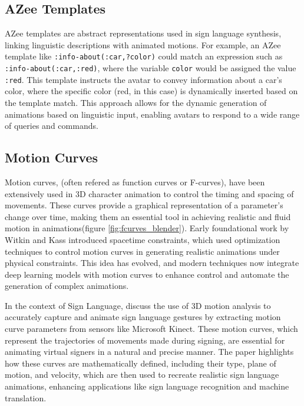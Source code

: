 \documentclass[../../main.tex]{subfiles}
\begin{document}
\subsection{AZee Templates}
\label{ch:intermediate_blocks:related_work:azee_templates}

AZee templates are abstract representations used in sign language synthesis, linking linguistic descriptions with animated motions. For example, an AZee template like \texttt{:info-about(:car,?color)} could match an expression such as \texttt{:info-about(:car,:red)}, where the variable \texttt{color} would be assigned the value \texttt{:red}. This template instructs the avatar to convey information about a car's color, where the specific color (red, in this case) is dynamically inserted based on the template match. This approach allows for the dynamic generation of animations based on linguistic input, enabling avatars to respond to a wide range of queries and commands.

\subsection{Motion Curves}
\label{ch:intermediate_blocks:related_work:motion_curves}

Motion curves, (often refered as function curves or F-curves), have been extensively used in 3D character animation to control the timing and spacing of movements. These curves provide a graphical representation of a parameter's change over time, making them an essential tool in achieving realistic and fluid motion in animations(figure \ref{fig:fcurves_blender}). Early foundational work by Witkin and Kass \cite{witkin1988spacetime} introduced spacetime constraints, which used optimization techniques to control motion curves in generating realistic animations under physical constraints. This idea has evolved, and modern techniques now integrate deep learning models with motion curves to enhance control and automate the generation of complex animations.

In the context of Sign Language, \cite{inproceedings} discuss the use of 3D motion analysis to accurately capture and animate sign language gestures by extracting motion curve parameters from sensors like Microsoft Kinect. These motion curves, which represent the trajectories of movements made during signing, are essential for animating virtual signers in a natural and precise manner. The paper highlights how these curves are mathematically defined, including their type, plane of motion, and velocity, which are then used to recreate realistic sign language animations, enhancing applications like sign language recognition and machine translation.
\end{document}

